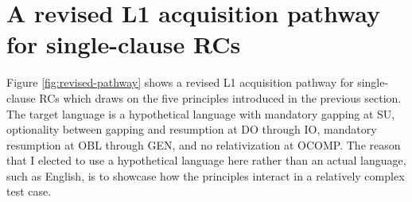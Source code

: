 \section{A revised L1 acquisition pathway for single-clause RCs}\label{acq-revised}

Figure \ref{fig:revised-pathway} shows a revised L1 acquisition pathway for single-clause RCs which draws on the five principles introduced in the previous section. The target language is a hypothetical language with mandatory gapping at SU, optionality between gapping and resumption at DO through IO, mandatory resumption at OBL through GEN, and no relativization at OCOMP. The reason that I elected to use a hypothetical language here rather than an actual language, such as English, is to showcase how the principles interact in a relatively complex test case. 

